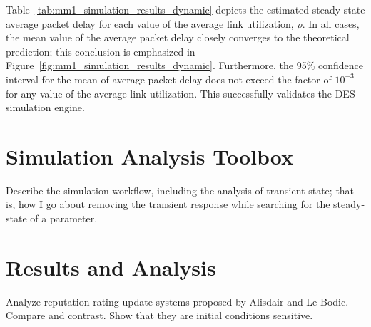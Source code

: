 Table~\ref{tab:mm1_simulation_results_dynamic} depicts the estimated steady-state average packet delay for each value of the average link utilization, $\rho$. In all cases, the mean value of the average packet delay closely converges to the theoretical prediction; this conclusion is emphasized in Figure~\ref{fig:mm1_simulation_results_dynamic}. Furthermore, the 95\% confidence interval for the mean of average packet delay does not exceed the factor of $10^{-3}$ for any value of the average link utilization. This successfully validates the DES simulation engine.

\section{Simulation Analysis Toolbox} %
\label{sec:simulation_analysis_toolbox_dynamic}
Describe the simulation workflow, including the analysis of transient state; that is, how I go about removing the transient response while searching for the steady-state of a parameter.

\section{Results and Analysis} %
\label{sec:results_and_analysis_dynamic}
Analyze reputation rating update systems proposed by Alisdair and Le Bodic. Compare and contrast. Show that they are initial conditions sensitive.
